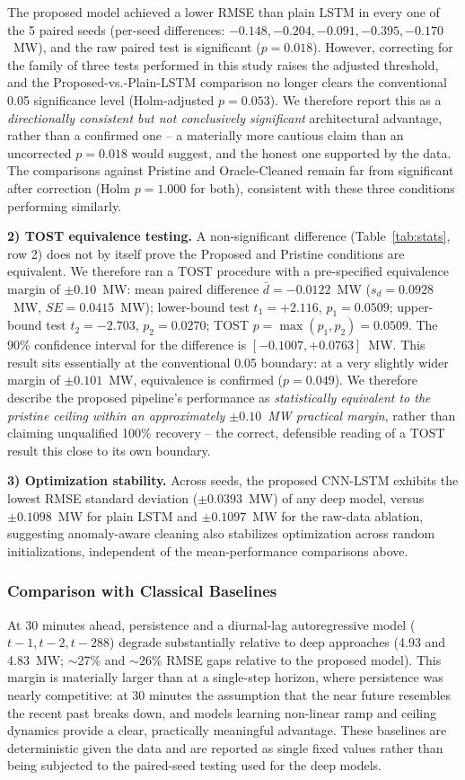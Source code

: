 \documentclass[conference]{IEEEtran}
\begin{document}
The proposed model achieved a lower RMSE than plain LSTM in every one of the 5 paired seeds (per-seed differences: $-0.148, -0.204, -0.091, -0.395, -0.170$~MW), and the raw paired test is significant ($p=0.018$). However, correcting for the family of three tests performed in this study raises the adjusted threshold, and the Proposed-vs.-Plain-LSTM comparison no longer clears the conventional 0.05 significance level (Holm-adjusted $p=0.053$). We therefore report this as a \emph{directionally consistent but not conclusively significant} architectural advantage, rather than a confirmed one -- a materially more cautious claim than an uncorrected $p=0.018$ would suggest, and the honest one supported by the data. The comparisons against Pristine and Oracle-Cleaned remain far from significant after correction (Holm $p=1.000$ for both), consistent with these three conditions performing similarly.

\textbf{2) TOST equivalence testing.} A non-significant difference (Table~\ref{tab:stats}, row 2) does not by itself prove the Proposed and Pristine conditions are equivalent. We therefore ran a TOST procedure with a pre-specified equivalence margin of $\pm 0.10$~MW: mean paired difference $\bar{d} = -0.0122$~MW ($s_d = 0.0928$~MW, $SE = 0.0415$~MW); lower-bound test $t_1 = +2.116$, $p_1 = 0.0509$; upper-bound test $t_2 = -2.703$, $p_2 = 0.0270$; TOST $p = \max(p_1,p_2) = 0.0509$. The 90\% confidence interval for the difference is $[-0.1007, +0.0763]$~MW. This result sits essentially at the conventional 0.05 boundary: at a very slightly wider margin of $\pm 0.101$~MW, equivalence is confirmed ($p=0.049$). We therefore describe the proposed pipeline's performance as \emph{statistically equivalent to the pristine ceiling within an approximately $\pm 0.10$~MW practical margin}, rather than claiming unqualified 100\% recovery -- the correct, defensible reading of a TOST result this close to its own boundary.

\textbf{3) Optimization stability.} Across seeds, the proposed CNN-LSTM exhibits the lowest RMSE standard deviation ($\pm0.0393$~MW) of any deep model, versus $\pm0.1098$~MW for plain LSTM and $\pm0.1097$~MW for the raw-data ablation, suggesting anomaly-aware cleaning also stabilizes optimization across random initializations, independent of the mean-performance comparisons above.

\subsubsection{Comparison with Classical Baselines}
At 30 minutes ahead, persistence and a diurnal-lag autoregressive model ($t{-}1, t{-}2, t{-}288$) degrade substantially relative to deep approaches (4.93 and 4.83~MW; $\sim$27\% and $\sim$26\% RMSE gaps relative to the proposed model). This margin is materially larger than at a single-step horizon, where persistence was nearly competitive: at 30 minutes the assumption that the near future resembles the recent past breaks down, and models learning non-linear ramp and ceiling dynamics provide a clear, practically meaningful advantage. These baselines are deterministic given the data and are reported as single fixed values rather than being subjected to the paired-seed testing used for the deep models.
\end{document}

